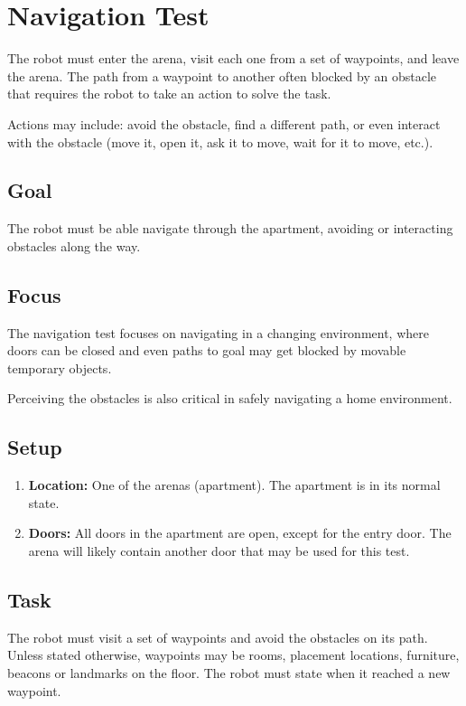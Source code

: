 \section{Navigation Test}

The robot must enter the arena, visit each one from a set of waypoints, and leave the arena. The path from a waypoint to another often blocked by an obstacle that requires the robot to take an action to solve the task.

Actions may include: avoid the obstacle, find a different path, or even interact with the obstacle (move it, open it, ask it to move, wait for it to move, etc.).

\subsection{Goal}
The robot must be able navigate through the apartment, avoiding or interacting obstacles along the way.

\subsection{Focus}
The navigation test focuses on navigating in a changing environment, where doors can be closed and even paths to goal may get blocked by movable temporary objects. 

Perceiving the obstacles is also critical in safely navigating a home environment.

\subsection{Setup}

\begin{enumerate}
	\item \textbf{Location:} One of the arenas (apartment). The apartment is in its normal state.
	\item \textbf{Doors:} All doors in the apartment are open, except for the entry door. The arena will likely contain another door that may be used for this test. 
\end{enumerate}

\subsection{Task}
The robot must visit a set of waypoints and avoid the obstacles on its path. Unless stated otherwise, waypoints may be rooms, placement locations, furniture, beacons or landmarks on the floor. The robot must state when it reached a new waypoint.

